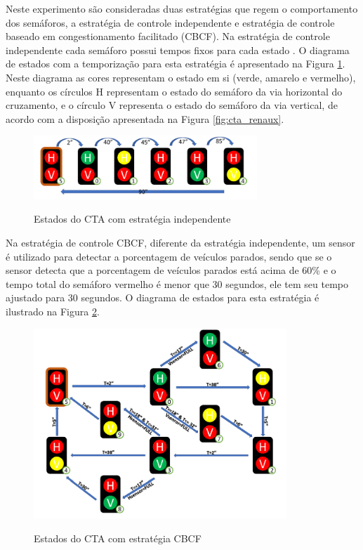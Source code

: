 Neste experimento são consideradas duas estratégias que regem o comportamento
dos semáforos, a estratégia de controle independente e estratégia de controle
baseado em congestionamento facilitado (CBCF). Na estratégia de controle
independente cada semáforo possui tempos fixos para cada estado
\cite{msc_negrini_2019}. O diagrama de estados com a temporização para esta
estratégia é apresentado na Figura \ref{fig:estados_cta}. Neste diagrama as
cores representam o estado em si (verde, amarelo e vermelho), enquanto os
círculos H representam o estado do semáforo da via horizontal do cruzamento, e o
círculo V representa o estado  do semáforo da via vertical, de acordo com a
disposição apresentada na Figura \ref{fig:cta_renaux}.

\begin{figure}[!htb]
\centering
\caption{Estados do CTA com estratégia independente}
\smallskip
\includegraphics[width=0.75\textwidth]{../figures/estados_cta.png}
\label{fig:estados_cta}
\end{figure}

\FloatBarrier

Na estratégia de controle CBCF, diferente da estratégia independente, um sensor
é utilizado para detectar a porcentagem de veículos parados, sendo que se o
sensor detecta que a porcentagem de veículos parados está acima de 60\% e o
tempo total do semáforo vermelho é menor que 30 segundos, ele tem seu tempo
ajustado para 30 segundos. O diagrama de estados para esta estratégia é
ilustrado na Figura \ref{fig:estados_cbcf}.

\begin{figure}[!htb]
\centering
\caption{Estados do CTA com estratégia CBCF}
\smallskip
\includegraphics[width=0.85\textwidth]{../figures/estados_cbcf.png}
\label{fig:estados_cbcf}
\end{figure}

